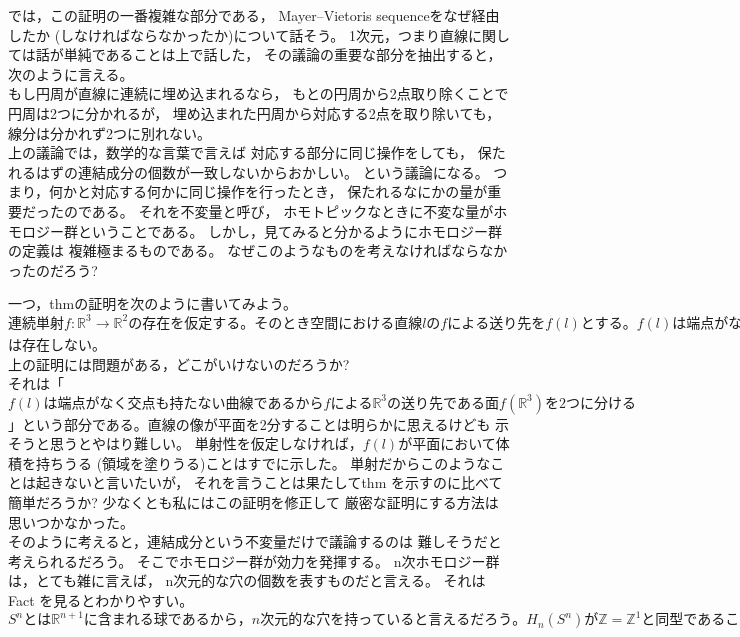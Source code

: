 \documentclass[uplatex]{jsarticle}
\begin{document}
では，この証明の一番複雑な部分である，
Mayer--Vietoris sequenceをなぜ経由したか
(しなければならなかったか)について話そう。
1次元，つまり直線に関しては話が単純であることは上で話した，
その議論の重要な部分を抽出すると，次のように言える。\\
もし円周が直線に連続に埋め込まれるなら，
もとの円周から2点取り除くことで円周は2つに分かれるが，
埋め込まれた円周から対応する2点を取り除いても，
線分は分かれず2つに別れない。\\
上の議論では，数学的な言葉で言えば
対応する部分に同じ操作をしても，
保たれるはずの連結成分の個数が一致しないからおかしい。
という議論になる。
つまり，何かと対応する何かに同じ操作を行ったとき，
保たれるなにかの量が重要だったのである。
それを不変量と呼び，
ホモトピックなときに不変な量がホモロジー群ということである。
しかし，見てみると分かるようにホモロジー群の定義は
複雑極まるものである。
なぜこのようなものを考えなければならなかったのだろう?

一つ，thmの証明を次のように書いてみよう。
\(連続単射f:\mathbb{R}^3\to\mathbb{R}^2 の存在を仮定する。
そのとき空間における直線lのfによる送り先をf(l)とする。
f(l)は端点がなく交点も持たない曲線であるから
fによる\mathbb{R}^3の
送り先である面f(\mathbb{R}^3)を2つに分ける。
一方，元の空間からlを除いても空間は2つに分かれない。
故に連結な空間の像が連結でなくなるので矛盾。
つまり 連続単射f:\mathbb{R}^3\to\mathbb{R}^2\)
は存在しない。\\

上の証明には問題がある，どこがいけないのだろうか?\\
それは「\(f(l)は端点がなく交点も持たない曲線であるから
fによる\mathbb{R}^3の
送り先である面f(\mathbb{R}^3)を2つに分ける\)
」という部分である。直線の像が平面を2分することは明らかに思えるけども
示そうと思うとやはり難しい。
単射性を仮定しなければ，\(f(l)\)が平面において体積を持ちうる
(領域を塗りうる)ことはすでに示した。
単射だからこのようなことは起きないと言いたいが，
それを言うことは果たしてthm
を示すのに比べて簡単だろうか?
少なくとも私にはこの証明を修正して
厳密な証明にする方法は思いつかなかった。\\

そのように考えると，連結成分という不変量だけで議論するのは
難しそうだと考えられるだろう。
そこでホモロジー群が効力を発揮する。
n次ホモロジー群は，とても雑に言えば，
n次元的な穴の個数を表すものだと言える。
それはFact
を見るとわかりやすい。
\(S^nとは\mathbb{R}^{n+1}に含まれる球であるから，
n次元的な穴を持っていると言えるだろう。
H_n(S^n)が\mathbb{Z}=\mathbb{Z}^1と
同型であることがそれを示している。
(\mathbb{Z}の指数部分が穴の個数と対応する)
一方，H_0(S^n)は0次元的な穴の数，
それは実は連結成分の個数と対応するので，
\mathbb{Z}=\mathbb{Z}^1と同型であることにより，
球面が連結であることを表している。
\)
\end{document}
